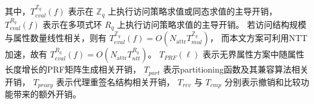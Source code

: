 
其中，$T^{\mathbb{Z}_q}_{eval}(f)$ 表示在 $\mathbb{Z}_q$ 上执行访问策略求值或同态求值的主导开销，
$T^{R_q}_{eval}(f)$ 表示在多项式环 $R_q$ 上执行访问策略求值的主导开销。
若访问结构规模与属性数量线性相关，则有
$T^{\mathbb{Z}_q}_{eval}(f)=O(N_{\mathrm{attr}}T^{\mathbb{Z}_q}_{mul})$，
而本文方案可利用NTT加速，故有
$T^{R_q}_{eval}(f)=O(N_{\mathrm{attr}}T^{R_q}_{ntt})$。
$T_{PRF}(\ell)$ 表示无界属性方案中随属性长度增长的PRF矩阵生成相关开销，
$T_{part}$ 表示partitioning函数及其兼容算法相关开销，
$T_{proxy}$ 表示代理重签名结构相关开销，
$T_{rev}$ 与 $T_{cmp}$ 分别表示撤销和比较功能带来的额外开销。
